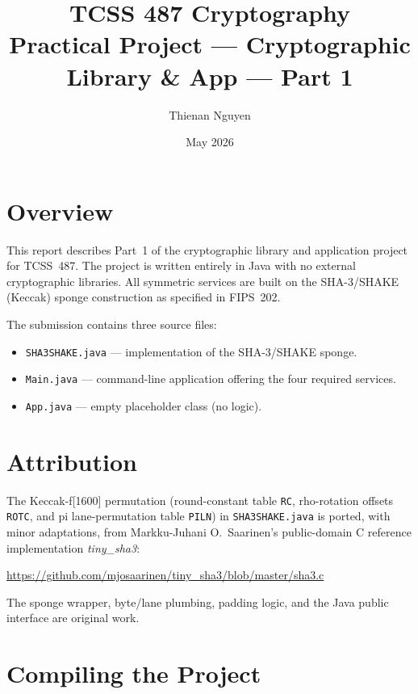 \documentclass[11pt]{article}
\title{\textbf{TCSS 487 Cryptography}\\[0.4em]
       \large Practical Project --- Cryptographic Library \& App --- Part 1}
\author{Thienan Nguyen}
\date{May 2026}
\begin{document}
\maketitle

\section{Overview}

This report describes Part~1 of the cryptographic library and application
project for TCSS~487. The project is written entirely in Java with no external
cryptographic libraries. All symmetric services are built on the SHA-3/SHAKE
(Keccak) sponge construction as specified in FIPS~202.

The submission contains three source files:

\begin{itemize}[noitemsep]
  \item \texttt{SHA3SHAKE.java} --- implementation of the SHA-3/SHAKE sponge.
  \item \texttt{Main.java} --- command-line application offering the four
        required services.
  \item \texttt{App.java} --- empty placeholder class (no logic).
\end{itemize}

\section{Attribution}

The Keccak-f[1600] permutation (round-constant table \texttt{RC},
rho-rotation offsets \texttt{ROTC}, and pi lane-permutation table
\texttt{PILN}) in \texttt{SHA3SHAKE.java} is ported, with minor adaptations,
from Markku-Juhani O.\ Saarinen's public-domain C reference implementation
\emph{tiny\_sha3}:
\begin{center}
  \url{https://github.com/mjosaarinen/tiny_sha3/blob/master/sha3.c}
\end{center}
The sponge wrapper, byte/lane plumbing, padding logic, and the Java public
interface are original work.

\section{Compiling the Project}
\end{document}
